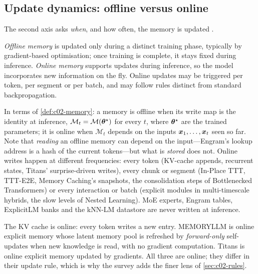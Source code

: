 \subsection{Update dynamics: offline versus online}\label{sec:c02-update}

The second axis asks \emph{when}, and how often, the memory is updated \citep[\S II-B]{zhoubian2026memory}.

\begin{definition}\label{def:c02-online}
\emph{Offline memory} is updated only during a distinct training phase, typically by gradient-based
optimisation; once training is complete, it stays fixed during inference. \emph{Online memory}
supports updates during inference, so the model incorporates new information on the fly. Online
updates may be triggered per token, per segment or per batch, and may follow rules distinct from
standard backpropagation.
\end{definition}

In terms of \cref{def:c02-memory}: a memory is offline when its write map is the identity at
inference, $\mathcal{M}_t = \mathcal{M}(\bm{\theta}^\star)$ for every $t$, where $\bm{\theta}^\star$ are
the trained parameters; it is online when $\mathcal{M}_t$ depends on the inputs
$\bm{x}_1,\dots,\bm{x}_t$ seen so far. Note that \emph{reading} an offline memory can depend on the
input---Engram's lookup address is a hash of the current tokens---but what is \emph{stored} does
not. Online writes happen at different frequencies: every token (KV-cache appends, recurrent
states, Titans' surprise-driven writes), every chunk or segment (In-Place TTT, TTT-E2E, Memory
Caching's snapshots, the consolidation steps of Bottlenecked Transformers) or every interaction or
batch (explicit modules in multi-timescale hybrids, the slow levels of Nested Learning). MoE
experts, Engram tables, ExplicitLM banks and the kNN-LM datastore are never written at inference.

\begin{example}\label{ex:c02-online}
The KV cache is online: every token writes a new entry. MEMORYLLM \citep{wang2024memoryllm}
is online explicit memory whose latent memory pool is refreshed by \emph{forward-only}
self-updates when new knowledge is read, with no gradient computation. Titans is online explicit
memory updated by gradients. All three are online; they differ in their update rule, which is why
the survey adds the finer lens of \cref{sec:c02-rules}.
\end{example}

